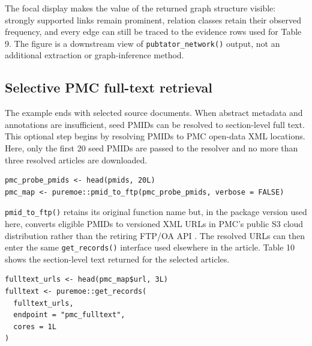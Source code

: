 The focal display makes the value of the returned graph structure visible:
strongly supported links remain prominent, relation classes retain their
observed frequency, and every edge can still be traced to the evidence rows
used for Table 9. The figure is a downstream view of \texttt{pubtator\_network()}
output, not an additional extraction or graph-inference method.

\subsection{Selective PMC full-text retrieval}\label{selective-pmc-full-text-retrieval}

The example ends with selected source documents. When abstract metadata and
annotations are insufficient, seed PMIDs can be resolved to section-level full
text. This optional step begins by resolving PMIDs to PMC open-data XML
locations. Here, only the first 20 seed PMIDs are passed to the resolver and no
more than three resolved articles are downloaded.

\begin{verbatim}
pmc_probe_pmids <- head(pmids, 20L)
pmc_map <- puremoe::pmid_to_ftp(pmc_probe_pmids, verbose = FALSE)
\end{verbatim}

\texttt{pmid\_to\_ftp()} retains its original function name but, in the package version
used here,
converts eligible PMIDs to versioned XML URLs in PMC's public S3 cloud
distribution rather than the retiring FTP/OA API \citep{nlm2026pmccloud}. The
resolved URLs can then enter the same \texttt{get\_records()} interface used elsewhere
in the article. Table 10 shows the section-level text returned for the selected
articles.

\begin{verbatim}
fulltext_urls <- head(pmc_map$url, 3L)
fulltext <- puremoe::get_records(
  fulltext_urls,
  endpoint = "pmc_fulltext",
  cores = 1L
)
\end{verbatim}

